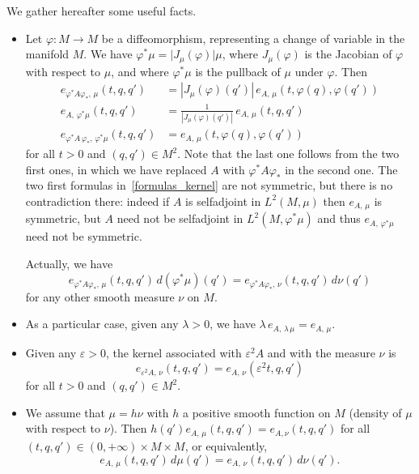 \documentclass[10pt]{amsart}
\theoremstyle{definition}\newtheorem{defi}[theo]{Definition}\newtheorem{rema}[theo]{Remark}\newtheorem{exam}[theo]{Example}\newtheorem{exem}[theo]{Example}\newtheorem{nota}[theo]{Notation}
\begin{document}
We gather hereafter some useful facts.
\begin{itemize}
\item Let $\varphi:M\rightarrow M$ be a diffeomorphism, representing a change of variable in the manifold $M$. We have $\varphi^*\mu = \vert J_\mu(\varphi)\vert\mu$, where $J_\mu(\varphi)$ is the Jacobian of $\varphi$ with respect to $\mu$, and where $\varphi^*\mu$ is the pullback of $\mu$ under $\varphi$. Then
\begin{equation}\label{formulas_kernel}
\begin{split}
e_{\varphi^*A\varphi_*,\,\mu}(t,q,q') &= \left\vert J_\mu(\varphi)(q')\right\vert\, e_{A,\,\mu}(t,\varphi(q),\varphi(q')) \\
e_{A,\,\varphi^*\mu}(t,q,q') &= \frac{1}{\left\vert J_\mu(\varphi)(q')\right\vert}\, e_{A,\,\mu}(t,q,q') \\
e_{\varphi^*A\,\varphi_*,\,\varphi^*\mu}(t,q,q') &= e_{A,\,\mu}\left(t,\varphi(q),\varphi(q')\right)
\end{split}
\end{equation}
for all $t>0$ and $(q,q')\in M^2$. Note that the last one follows from the two first ones, in which we have replaced $A$ with $\varphi^*A\varphi_*$ in the second one. The two first formulas in~\eqref{formulas_kernel} are not symmetric, but there is no contradiction there: indeed if $A$ is selfadjoint in $L^2(M,\mu)$ then $e_{A,\,\mu}$ is symmetric, but $A$ need not be selfadjoint in $L^2(M,\varphi^*\mu)$ and thus $e_{A,\,\varphi^*\mu}$ need not be symmetric.

Actually, we have
\[
e_{\varphi^*A\varphi_*,\,\mu}(t,q,q')\, d(\varphi^*\mu)(q') = e_{\varphi^*A\varphi_*,\,\nu}(t,q,q')\, d\nu(q')
\]
for any other smooth measure $\nu$ on $M$.

\item As a particular case, given any $\lambda>0$, we have $\lambda\, e_{A,\,\lambda\,\mu} = e_{A,\,\mu} $.

\item Given any $\varepsilon>0$, the kernel associated with $\varepsilon^2 A$ and with the measure $\nu$ is
\begin{equation*}
e_{\varepsilon^2 A,\, \nu}(t,q,q') = e_{A,\,\nu}(\varepsilon^2 t,q,q')
\end{equation*}
for all $t>0$ and $(q,q')\in M^2$.


\item We assume that $\mu=h\nu$ with $h$ a positive smooth function on $M$ (density of $\mu$ with respect to $\nu$). Then $h(q')e_{A,\,\mu}(t,q,q')=e_{A,\nu}(t,q,q')$ for all $(t,q,q')\in(0,+\infty)\times M\times M$, or equivalently,
\begin{equation}\label{kernel_change_measure}
e_{A,\,\mu}(t,q,q')\, d\mu(q') = e_{A,\,\nu}(t,q,q')\, d\nu(q').
\end{equation}
\end{itemize}
\end{document}
